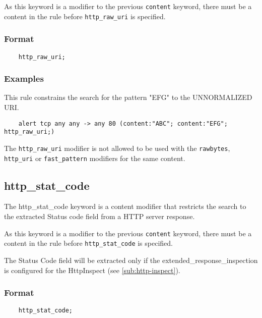 \documentclass[english]{report}
\newenvironment{note}{
\samepage
    \vspace{10pt}{\textsf{
        {\hspace{7pt}\Huge{$\triangle$\hspace{-12.5pt}{\Large{$^!$}}}}\hspace{5pt}
        {\Large{NOTE}}
    }
    }
   \begin{center}
    \par\vspace{-17pt}

    \begin{lrbox}{\savepar}
    \begin{minipage}[r]{6in}
}
{
    \end{minipage}
    \end{lrbox}
    \fbox{
        \usebox{
            \savepar
	}
    }
    \par\vskip10pt
    \end{center}
}
\newenvironment{note}{
        \begin{rawhtml}
        <p><table border="1"><tr><td><b>
        Note:&nbsp;&nbsp;</b>
        \end{rawhtml}
}{
        \begin{rawhtml}
        </b></td></tr></table></p>
        \end{rawhtml}
}
\begin{document}
As this keyword is a modifier to the previous \texttt{content} keyword, there must be
a content in the rule before \texttt{http\_raw\_uri} is specified.

\subsubsection{Format}

\begin{verbatim}
    http_raw_uri;
\end{verbatim}

\subsubsection{Examples}

This rule constrains the search for the pattern "EFG" to the UNNORMALIZED URI.

\begin{verbatim}
    alert tcp any any -> any 80 (content:"ABC"; content:"EFG"; http_raw_uri;)
\end{verbatim}
\begin{note}

The \texttt{http\_raw\_uri} modifier is not allowed to be used with the
\texttt{rawbytes}, \texttt{http\_uri} or \texttt{fast\_pattern} modifiers for the same
content.

\end{note}

\subsection{http\_stat\_code}
\label{sub:HttpStatCode}

The http\_stat\_code keyword is a content modifier that restricts the search to the
extracted Status code field from a HTTP server response.

As this keyword is a modifier to the previous \texttt{content} keyword, there must be
a content in the rule before \texttt{http\_stat\_code} is specified. 

The Status Code field will be extracted only if the extended\_response\_inspection is 
configured for the HttpInspect (see \ref{sub:http-inspect}).

\subsubsection{Format}

\begin{verbatim}
    http_stat_code;
\end{verbatim}
\end{document}
